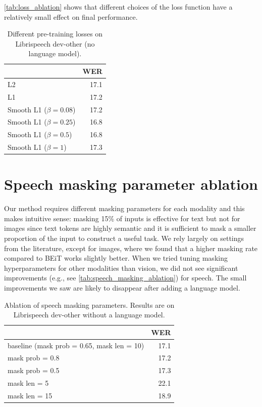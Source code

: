 \documentclass[nohyperref]{article}
\theoremstyle{plain}
\theoremstyle{definition}
\theoremstyle{remark}
\begin{document}
\autoref{tab:loss_ablation} shows that different choices of the loss function have a relatively small effect on final performance.

\begin{table}[h]
\centering
\caption{Different pre-training losses on Librispeech dev-other (no language model). 
\label{tab:loss_ablation}}
\begin{tabular}[t]{lr}
\toprule
& WER \\
\midrule
L2 & 17.1 \\
L1 & 17.2 \\
Smooth L1 ($\beta=0.08$) & 17.2 \\
Smooth L1 ($\beta=0.25$) & 16.8 \\
Smooth L1 ($\beta=0.5$) & 16.8 \\
Smooth L1 ($\beta=1$) & 17.3 \\
\bottomrule
\end{tabular}
\end{table}

\section{Speech masking parameter ablation}

Our method requires different masking parameters for each modality and this makes intuitive sense: masking 15\% of inputs is effective for text but not for images since text tokens are highly semantic and it is sufficient to mask a smaller proportion of the input to construct a useful task.
We rely largely on settings from the literature, except for images, where we found that a higher masking rate compared to BEiT works slightly better.
When we tried tuning masking hyperparameters for other modalities than vision, we did not see significant improvements (e.g., see \autoref{tab:speech_masking_ablation}) for speech. 
The small improvements we saw are likely to disappear after adding a language model.

\begin{table}[h]
\centering
\caption{Ablation of speech masking parameters. Results are on Librispeech dev-other without a language model. 
\label{tab:speech_masking_ablation}}
\begin{tabular}[t]{lr}
\toprule
& WER \\
\midrule
baseline (mask prob = 0.65, mask len = 10) & 17.1 \\
mask prob = 0.8 & 17.2 \\
mask prob = 0.5 & 17.3 \\
mask len = 5 & 22.1 \\
mask len = 15 & 18.9 \\
\bottomrule
\end{tabular}
\end{table}
\end{document}
